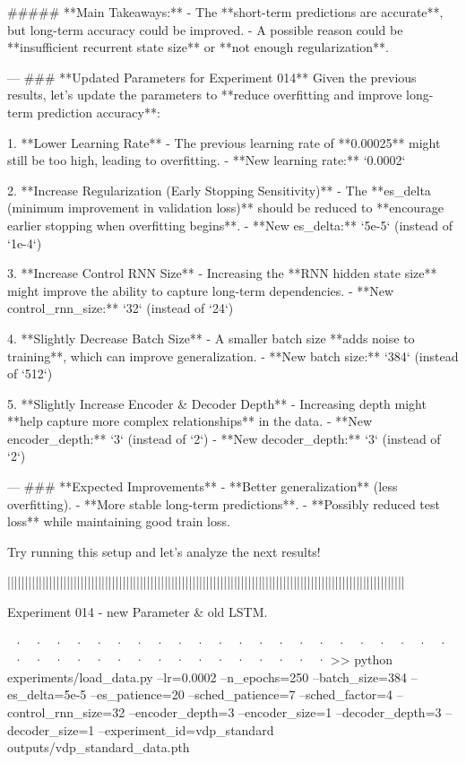 ##### **Main Takeaways:**
- The **short-term predictions are accurate**, but long-term accuracy could be improved.
- A possible reason could be **insufficient recurrent state size** or **not enough regularization**.

---
### **Updated Parameters for Experiment 014**
Given the previous results, let's update the parameters to **reduce overfitting and improve long-term prediction accuracy**:

1. **Lower Learning Rate**  
   - The previous learning rate of **0.00025** might still be too high, leading to overfitting.  
   - **New learning rate:** `0.0002`

2. **Increase Regularization (Early Stopping Sensitivity)**
   - The **es_delta (minimum improvement in validation loss)** should be reduced to **encourage earlier stopping when overfitting begins**.
   - **New es_delta:** `5e-5` (instead of `1e-4`)

3. **Increase Control RNN Size**
   - Increasing the **RNN hidden state size** might improve the ability to capture long-term dependencies.
   - **New control_rnn_size:** `32` (instead of `24`)

4. **Slightly Decrease Batch Size**
   - A smaller batch size **adds noise to training**, which can improve generalization.
   - **New batch size:** `384` (instead of `512`)

5. **Slightly Increase Encoder & Decoder Depth**
   - Increasing depth might **help capture more complex relationships** in the data.
   - **New encoder_depth:** `3` (instead of `2`)  
   - **New decoder_depth:** `3` (instead of `2`)  


---
### **Expected Improvements**
- **Better generalization** (less overfitting).  
- **More stable long-term predictions**.  
- **Possibly reduced test loss** while maintaining good train loss.  

Try running this setup and let's analyze the next results! 

||||||||||||||||||||||||||||||||||||||||||||||||||||||||||||||||||||||||||||||||||||||||||||||||||||||||||||||||||


Experiment 014 - new Parameter & old LSTM. 


~· ~· ~· ~· ~· ~· ~· ~· ~· ~· ~· ~· ~· ~· ~· ~· ~· ~· ~· ~· ~· ~· ~· ~· ~· ~· ~· ~· ~· ~· ~· ~· ~· ~· ~· ~· ~· ~· 
>> python experiments/load_data.py --lr=0.0002 --n_epochs=250 --batch_size=384 --es_delta=5e-5 --es_patience=20 --sched_patience=7 --sched_factor=4 --control_rnn_size=32 --encoder_depth=3 --encoder_size=1 --decoder_depth=3 --decoder_size=1 --experiment_id=vdp_standard outputs/vdp_standard_data.pth

